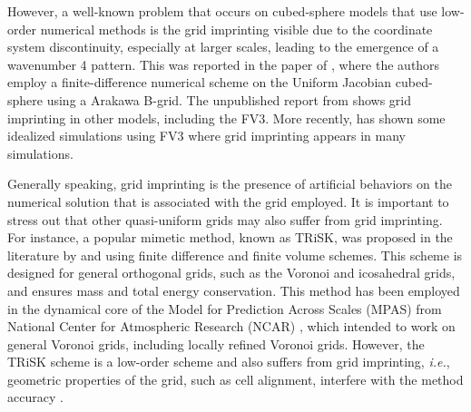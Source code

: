 However, a well-known problem that occurs on cubed-sphere models that use low-order numerical methods
is the grid imprinting visible due to the coordinate system discontinuity, 
especially at larger scales, leading to the emergence of a wavenumber 4 pattern.
This was reported in the paper of \citet{rancic:2017}, where the authors employ a 
finite-difference numerical scheme on the Uniform Jacobian cubed-sphere using a Arakawa B-grid.
The unpublished report from \citet{whitaker:2015} shows grid imprinting in other models, including 
the FV3.
More recently, \citet{mouallem:2023} has shown some idealized simulations using FV3 where grid imprinting appears in many simulations.

Generally speaking, grid imprinting is the presence of artificial behaviors on 
the numerical solution that is associated with the grid employed.
It is important to stress out that other quasi-uniform grids may also suffer from grid imprinting.
For instance, a popular mimetic method, known as TRiSK, was proposed in the literature by
\citet{thuburn:2009} and \citet{ringler:2010} using finite difference and finite volume schemes.
This scheme is designed for general orthogonal grids, such as the Voronoi and icosahedral grids,
and ensures mass and total energy conservation.
This method has been employed in the dynamical core of the Model for Prediction Across Scales (MPAS)
from National Center for Atmospheric Research (NCAR) \citep{skamarock:2012}, 
which intended to work on general Voronoi grids, including locally refined Voronoi grids.
However, the TRiSK scheme is a low-order scheme and also suffers from grid imprinting, \textit{i.e.},
geometric properties of the grid, such as cell alignment, interfere with the method accuracy
\citep{weller:2012, peixoto:2013, peixoto:2016}.

